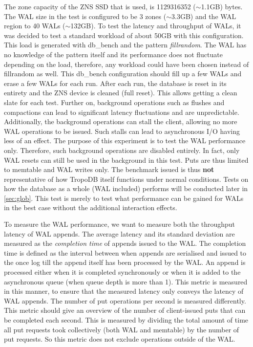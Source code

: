 The zone capacity of the ZNS SSD that is used, is 1129316352 ($\sim$1.1GB) bytes. The WAL size in the test is configured to be 3 zones ($\sim$3.3GB) and the WAL region to 40 WALs ($\sim$132GB). To test the latency and throughput of WALs, it was decided to test a standard workload of about 50GB with this configuration. This load is generated with db\_bench and the pattern \textit{fillrandom}. The WAL has no knowledge of the pattern itself and its performance does not fluctuate depending on the load, therefore, any workload could have been chosen instead of fillrandom as well. This db\_bench configuration should fill up a few WALs and erase a few WALs for each run. After each run, the database is reset in its entirety and the ZNS device is cleaned (full reset). This allows getting a clean slate for each test. Further on, background operations such as flushes and compactions can lead to significant latency fluctuations and are unpredictable. Additionally, the background operations can stall the client, allowing no more WAL operations to be issued. Such stalls can lead to asynchronous I/O having less of an effect. The purpose of this experiment is to test the WAL performance only. Therefore, such background operations are disabled entirely. In fact, only WAL resets can still be used in the background in this test. Puts are thus limited to memtable and WAL writes only. The benchmark issued is thus \textbf{not} representative of how TropoDB itself functions under normal conditions. Tests on how the database as a whole (WAL included) performs will be conducted later in \autoref{sec:glob}. This test is merely to test what performance can be gained for WALs in the best case without the additional interaction effects.  

To measure the WAL performance, we want to measure both the throughput latency of WAL appends. The average latency and its standard deviation are measured as the \textit{completion time} of appends issued to the WAL. The completion time is defined as the interval between when appends are serialised and issued to the once log till the append itself has been processed by the WAL. An append is processed either when it is completed synchronously or when it is added to the asynchronous queue (when queue depth is more than 1). This metric is measured in this manner, to ensure that the measured latency only conveys the latency of WAL appends. The number of put operations per second is measured differently. This metric should give an overview of the number of client-issued puts that can be completed each second. This is measured by dividing the total amount of time all put requests took collectively (both WAL and memtable) by the number of put requests. So this metric does not exclude operations outside of the WAL.


